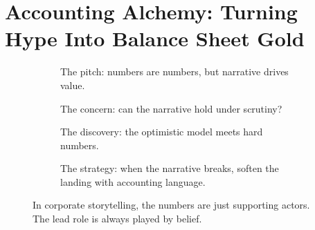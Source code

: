 \section{Accounting Alchemy: Turning Hype Into Balance Sheet Gold}

\vfill

\begin{figure}[H]
    \centering
  
    \begin{subfigure}[t]{0.45\textwidth}
    \centering
    \caption*{The pitch: numbers are numbers, but narrative drives value.}
    \end{subfigure}
    \hfill
    \begin{subfigure}[t]{0.45\textwidth}
    \centering
    \caption*{The concern: can the narrative hold under scrutiny?}
    \end{subfigure}
  
    \vspace{1em}
  
    \begin{subfigure}[t]{0.45\textwidth}
    \centering
    \caption*{The discovery: the optimistic model meets hard numbers.}
    \end{subfigure}
    \hfill
    \begin{subfigure}[t]{0.45\textwidth}
    \centering
    \caption*{The strategy: when the narrative breaks, soften the landing with accounting language.}
    \end{subfigure}
  
    \caption*{In corporate storytelling, the numbers are just supporting actors. The lead role is always played by belief.}
  \end{figure}


